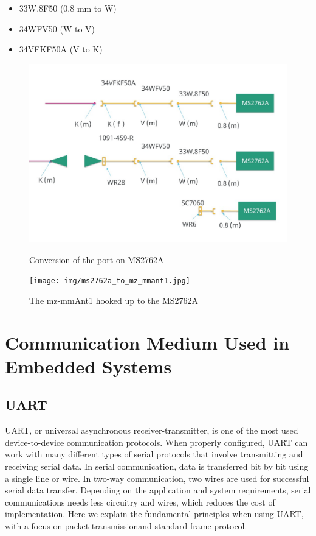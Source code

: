 \documentclass[a4paper,12pt]{report}
\begin{document}
\begin{itemize}
  \item 33W.8F50 (0.8 mm to W)
  \item 34WFV50 (W to V)
  \item 34VFKF50A (V to K)
\end{itemize}

\begin{figure}
  \centering
  \begin{minipage}{0.45\textwidth}
    \centering
    \includegraphics[clip, keepaspectratio, width=0.9\linewidth]{img/ms2762a_adapter_diagram.JPG}
    \caption{Conversion of the port on MS2762A}
    \label{img:ms2762a_adapter_diagram}
  \end{minipage}\hfill
  \begin{minipage}{0.45\textwidth}
    \centering
    \texttt{[image: img/ms2762a\_to\_mz\_mmant1.jpg]}
    \caption{The mz-mmAnt1 hooked up to the MS2762A}
    \label{img:ms2762a_to_mz_mmant1}
  \end{minipage}\hfill
\end{figure}

\section{Communication Medium Used in Embedded Systems}

\subsection{UART}

UART, or universal asynchronous receiver-transmitter,
is one of the most used device-to-device communication protocols.
When properly configured,
UART can work with many different types of serial protocols that
involve transmitting and receiving serial data.
In serial communication,
data is transferred bit by bit using a single line or wire.
In two-way communication,
two wires are used for successful serial data transfer.
Depending on the application and system requirements,
serial communications needs less circuitry and wires,
which reduces the cost of implementation.
Here we explain the fundamental principles when using UART,
with a focus on packet transmissionand standard frame protocol.
\end{document}
